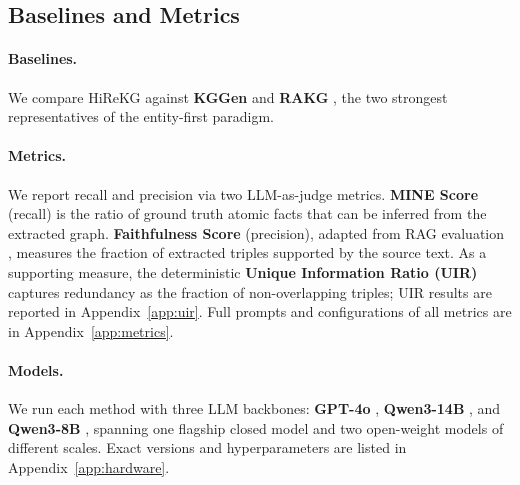 \documentclass[11pt]{article}
\begin{document}



\subsection{Baselines and Metrics}
\label{sec:baselines}
\paragraph{Baselines.} We compare HiReKG against \textbf{KGGen} \citep{kggen} and \textbf{RAKG} \citep{rakg}, the two strongest representatives of the entity-first paradigm.
\paragraph{Metrics.} We report recall and precision via two LLM-as-judge metrics. \textbf{MINE Score} \citep{kggen} (recall) is the ratio of ground truth atomic facts that can be inferred from the extracted graph. \textbf{Faithfulness Score} (precision), adapted from RAG evaluation \citep{ragas}, measures the fraction of extracted triples supported by the source text. As a supporting measure, the deterministic \textbf{Unique Information Ratio (UIR)} captures redundancy as the fraction of non-overlapping triples; UIR results are reported in Appendix~\ref{app:uir}. Full prompts and configurations of all metrics are in Appendix~\ref{app:metrics}.
\paragraph{Models.} We run each method with three LLM backbones: \textbf{GPT-4o} \citep{gpt4o}, \textbf{Qwen3-14B} \citep{qwen3_14b}, and \textbf{Qwen3-8B} \citep{qwen3_8b}, spanning one flagship closed model and two open-weight models of different scales. Exact versions and hyperparameters are listed in Appendix~\ref{app:hardware}.
\end{document}
